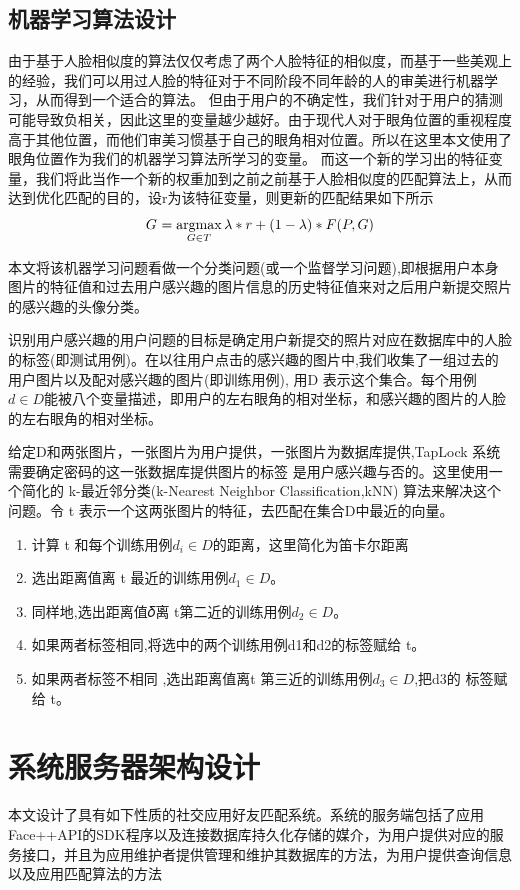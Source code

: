 \subsection{机器学习算法设计}
由于基于人脸相似度的算法仅仅考虑了两个人脸特征的相似度，而基于一些美观上的经验，我们可以用过人脸的特征对于不同阶段不同年龄的人的审美进行机器学习，从而得到一个适合的算法。
但由于用户的不确定性，我们针对于用户的猜测可能导致负相关，因此这里的变量越少越好。由于现代人对于眼角位置的重视程度高于其他位置，而他们审美习惯基于自己的眼角相对位置。所以在这里本文使用了眼角位置作为我们的机器学习算法所学习的变量。
而这一个新的学习出的特征变量，我们将此当作一个新的权重加到之前之前基于人脸相似度的匹配算法上，从而达到优化匹配的目的，设r为该特征变量，则更新的匹配结果如下所示
\begin{equation*}
G^{\*} = \mathop{\argmax_{G \in T}}{\lambda * r+(1-\lambda)* F(P,G)}
\end{equation*}

本文将该机器学习问题看做一个分类问题(或一个监督学习问题),即根据用户本身图片的特征值和过去用户感兴趣的图片信息的历史特征值来对之后用户新提交照片的感兴趣的头像分类。

识别用户感兴趣的用户问题的目标是确定用户新提交的照片对应在数据库中的人脸的标签(即测试用例)。在以往用户点击的感兴趣的图片中,我们收集了一组过去的用户图片以及配对感兴趣的图片(即训练用例), 用D 表示这个集合。每个用例$d \in D$能被八个变量描述，即用户的左右眼角的相对坐标，和感兴趣的图片的人脸的左右眼角的相对坐标。

给定D和两张图片，一张图片为用户提供，一张图片为数据库提供,TapLock 系统需要确定密码的这一张数据库提供图片的标签 是用户感兴趣与否的。这里使用一个简化的 k-最近邻分类(k-Nearest Neighbor Classification,kNN)\parencite{ML1}\parencite{ML2}\parencite{ML3} 算法来解决这个问题。令 t 表示一个这两张图片的特征，去匹配在集合D中最近的向量。
\begin{enumerate}
\item 计算 t 和每个训练用例$d_{i} \in D$的距离，这里简化为笛卡尔距离
\item 选出距离值离 t 最近的训练用例$d_{1} \in D$。
\item 同样地,选出距离值𝛿离 t第二近的训练用例$d_{2} \in D$。
\item 如果两者标签相同,将选中的两个训练用例d1和d2的标签赋给 t。
\item 如果两者标签不相同 ,选出距离值离t 
第三近的训练用例$d_{3} \in D$,把d3的
标签赋给 t。
\end{enumerate}

\section{系统服务器架构设计}
本文设计了具有如下性质的社交应用好友匹配系统。系统的服务端包括了应用Face++API的SDK程序以及连接数据库持久化存储的媒介，为用户提供对应的服务接口，并且为应用维护者提供管理和维护其数据库的方法，为用户提供查询信息以及应用匹配算法的方法

